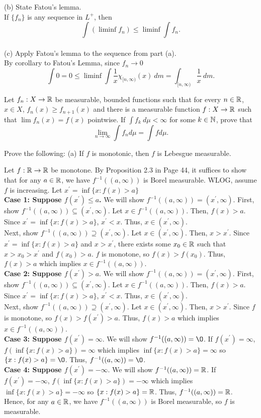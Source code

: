 \begin{list}
(b) State Fatou's lemma. \\
If $\{f_n\}$ is any sequence in $L^+$, then 
	\[
	\int(\liminf f_n) \leq \liminf \int f_n.
	\]
\\
(c) Apply Fatou's lemma to the sequence from part (a).\\
By corollary to Fatou's Lemma, since $f_n \rightarrow 0$
\[
\int 0 =0 \leq \liminf \int \frac{1}{x}\chi_{[n, \infty)}(x) \ dm = \int_{[n, \infty)} \frac{1}{x} \ dm.\]
\item Let $f_n: X \rightarrow {\mathbb R}$ be measurable, bounded functions such that for every $n \in {\mathbb R}$, $x \in X$, $f_n(x) \geq f_{n+1}(x)$ and there is a measurable function $f: X \rightarrow {\mathbb R}$ such that $\lim f_n(x)=f(x)$ pointwise. If $\int f_k \ d \mu < \infty$ for some $k \in {\mathbb N}$, prove that 
\[
\lim_{n \rightarrow \infty} \int f_n d \mu = \int f d\mu.
\]
\item Prove the following:
(a) If $f$ is monotonic, then $f$ is Lebesgue measurable. 
\begin{pf}
	Let $f: {\mathbb R} \rightarrow {\mathbb R}$ be monotone.  By Proposition
2.3 in Page 44, it suffices to show that for any $a \in {\mathbb R}$, we have $f^{−1}((a, \infty))$ is Borel measurable. WLOG, assume $f$ is increasing. Let $x^{'}=\inf \{x : f(x) >a  \}$\\
	\textbf{Case 1:	Suppose $f(x^{'}) \leq a$.}
 We will show $f^{-1}((a, \infty))=(x^{'}, \infty)$. First, show $f^{-1}((a, \infty))\subseteq (x^{'}, \infty)$. Let $x \in f^{-1}((a, \infty))$. Then, $f(x)>a$. Since $x^{'}=\inf \{x : f(x) >a  \}$, $x^{'}<x$. Thus, $x \in (x^{'}, \infty)$. \\
	Next, show $f^{-1}((a, \infty))\supseteq (x^{'}, \infty)$. Let $x \in (x^{'}, \infty)$. Then, $x>x^{'}$.  Since $x^{'}=\inf \{x : f(x) >a  \}$ and $x>x^{'}$, there exists some $x_0 \in {\mathbb R}$ such that $x>x_0>x^{'}$ and $f(x_0)>a$. $f$ is monotone, so $f(x)>f(x_0)$. Thus, $f(x)>a$ which implies $x \in f^{-1}((a, \infty))$.  \\
\textbf{Case 2: Suppose $f(x^{'}) > a$}. We will show $f^{-1}((a, \infty))=(x^{'}, \infty)$. First, show $f^{-1}((a, \infty))\subseteq (x^{'}, \infty)$. Let $x \in f^{-1}((a, \infty))$. Then, $f(x)>a$. Since $x^{'}=\inf \{x : f(x) >a  \}$, $x^{'}<x$. Thus, $x \in (x^{'}, \infty)$. \\
	Next, show $f^{-1}((a, \infty))\supseteq (x^{'}, \infty)$. Let $x \in (x^{'}, \infty)$. Then, $x>x^{'}$.  Since $f$ is monotone, so $f(x)>f(x^{'})> a$. Thus, $f(x)>a$ which implies $x \in f^{-1}((a, \infty))$.  \\
	\textbf{Case 3: Suppose $f(x^{'}) =\infty$}. We will show $f^{-1}((a, \infty))=\O$. If $f(x^{'}) =\infty$, $f(\inf\{x : f(x)>a\}) =\infty$ which implies $\inf\{x : f(x)>a\} =\infty$ so $\{x : f(x)>a\}=\O$. Thus, $f^{-1}((a, \infty))=\O$.\\
	\textbf{Case 4: Suppose $f(x^{'})=-\infty$}. We will show $f^{-1}((a, \infty))={\mathbb R}$. If $f(x^{'}) =-\infty$, $f(\inf\{x : f(x)>a\}) =-\infty$ which implies $\inf\{x : f(x)>a\} =-\infty$ so $\{x : f(x)>a\}={\mathbb R}$. Thus, $f^{-1}((a, \infty))={\mathbb R}$.\\
	Hence, for any $a \in {\mathbb R}$, we have $f^{−1}((a, \infty))$ is Borel measurable, so $f$ is measurable. 
\end{pf}


\end{list}
